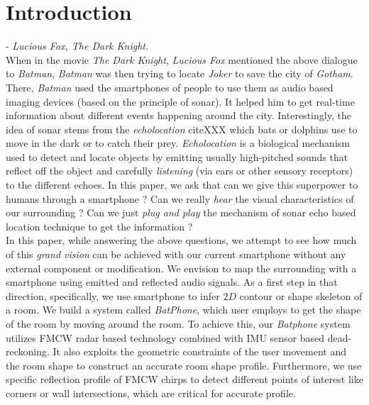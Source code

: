 \section{Introduction}
\textit{} - \textit{Lucious Fox, The Dark Knight.}\\

When in the movie \textit{The Dark Knight}, \textit{Lucious Fox} mentioned the above dialogue to \textit{Batman}, \textit{Batman} was then trying to locate \textit{Joker} to save the city of \textit{Gotham}. There, \textit{Batman} used the smartphones of people to use them as audio based imaging devices (based on the principle of sonar). It helped him to get real-time information about different events happening around the city. Interestingly, the idea of sonar stems from the \textit{echolocation} cite{XXX} which bats or dolphins use to move in the dark or to catch their prey. \textit{Echolocation} is a biological mechanism used to detect and locate objects by emitting usually high-pitched sounds that reflect off the object and carefully \textit{listening} (via ears or other sensory receptors) to the different echoes. In this paper, we ask that can we give this superpower to humans through a smartphone ? Can we really \textit{hear} the visual characteristics of our surrounding ? Can we just \textit{plug and play} the mechanism of sonar \ie echo based location technique to get the information ? \\

In this paper, while answering the above questions, we attempt to see how much of this \textit{grand vision} can be achieved with our current smartphone without any external component or modification. We envision to map the surrounding with a smartphone using emitted and reflected audio signals.  As a first step in that direction, specifically, we use smartphone to infer $2D$ contour or shape skeleton of a room. We build a system called \textit{BatPhone}, which user employs to get the shape of the room by moving around the room. To achieve this, our \textit{Batphone} system utilizes FMCW radar based technology combined with IMU sensor based dead-reckoning. It also exploits the geometric constraints of the user movement and the room shape to construct an accurate room shape profile. Furthermore, we use specific reflection profile of FMCW chirps to detect different points of interest like corners or wall intersections, which are critical for accurate profile. \\

